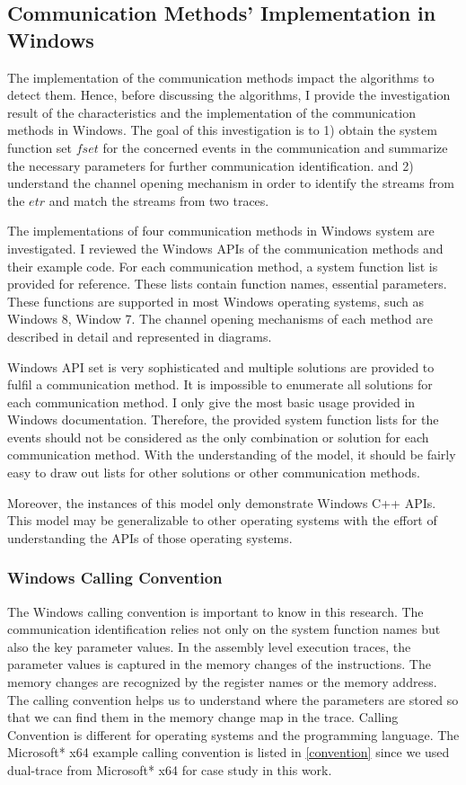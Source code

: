 \subsection{Communication Methods' Implementation in Windows}\label{windows}
The implementation of the communication methods impact the algorithms to detect them. Hence, before discussing the algorithms, I provide the investigation result of the characteristics and the implementation of the communication methods in Windows. The goal of this investigation is to 1) obtain the system function set $fset$ for the concerned events in the communication and summarize the necessary parameters for further communication identification. and 2) understand the channel opening mechanism in order to identify the streams from the $etr$ and match the streams from two traces.

The implementations of four communication methods in Windows system are investigated. I reviewed the Windows APIs of the communication methods and their example code. For each communication method, a system function list is provided for reference. These lists contain function names, essential parameters. These functions are supported in most Windows operating systems, such as Windows 8, Window 7. The channel opening mechanisms of each method are described in detail and represented in diagrams.

Windows API set is very sophisticated and multiple solutions are provided to fulfil a communication method. It is impossible to enumerate all solutions for each communication method. I only give the most basic usage provided in Windows documentation. Therefore, the provided system function lists for the events should not be considered as the only combination or solution for each communication method. With the understanding of the model, it should be fairly easy to draw out lists for other solutions or other communication methods. 

Moreover, the instances of this model only demonstrate Windows C++ APIs. This model may be generalizable to other operating systems with the effort of understanding the APIs of those operating systems.

\subsubsection{Windows Calling Convention}
The Windows calling convention is important to know in this research. The communication identification relies not only on the system function names but also the key parameter values. In the assembly level execution traces, the parameter values is captured in the memory changes of the instructions. The memory changes are recognized by the register names or the memory address. The calling convention helps us to understand where the parameters are stored so that we can find them in the memory change map in the trace. Calling Convention is different for operating systems and the programming language. The Microsoft* x64 example calling convention is listed in \ref{convention} since we used dual-trace from Microsoft* x64 for case study in this work.

